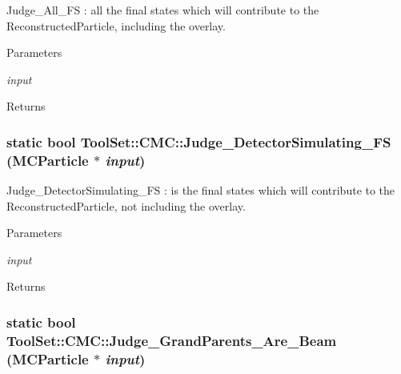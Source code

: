Judge\_\-All\_\-FS : all the final states which will contribute to the ReconstructedParticle, including the overlay. 
\begin{DoxyParams}{Parameters}
\item[{\em input}]\end{DoxyParams}
\begin{DoxyReturn}{Returns}

\end{DoxyReturn}
\hypertarget{classToolSet_1_1CMC_afee9479237283cf64d769fb1b1a361ae}{
\subsubsection[{Judge\_\-DetectorSimulating\_\-FS}]{\setlength{\rightskip}{0pt plus 5cm}static bool ToolSet::CMC::Judge\_\-DetectorSimulating\_\-FS (MCParticle $\ast$ {\em input})}}
\label{classToolSet_1_1CMC_afee9479237283cf64d769fb1b1a361ae}


Judge\_\-DetectorSimulating\_\-FS : is the final states which will contribute to the ReconstructedParticle, not including the overlay. 
\begin{DoxyParams}{Parameters}
\item[{\em input}]\end{DoxyParams}
\begin{DoxyReturn}{Returns}

\end{DoxyReturn}
\hypertarget{classToolSet_1_1CMC_ad09856f709fff7320c382efd26a408e9}{
\subsubsection[{Judge\_\-GrandParents\_\-Are\_\-Beam}]{\setlength{\rightskip}{0pt plus 5cm}static bool ToolSet::CMC::Judge\_\-GrandParents\_\-Are\_\-Beam (MCParticle $\ast$ {\em input})}}
\label{classToolSet_1_1CMC_ad09856f709fff7320c382efd26a408e9}


